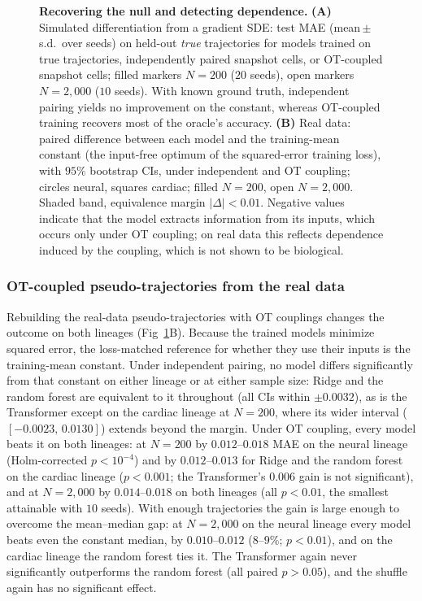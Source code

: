 \documentclass[10pt,letterpaper]{article}
\begin{document}
\begin{figure}[!h]
\caption{\textbf{Recovering the null and detecting dependence.} \textbf{(A)} Simulated differentiation from a gradient SDE: test MAE (mean\,$\pm$\,s.d.\ over seeds) on held-out \emph{true} trajectories for models trained on true trajectories, independently paired snapshot cells, or OT-coupled snapshot cells; filled markers $N=200$ ($20$ seeds), open markers $N=2{,}000$ ($10$ seeds). With known ground truth, independent pairing yields no improvement on the constant, whereas OT-coupled training recovers most of the oracle's accuracy. \textbf{(B)} Real data: paired difference between each model and the training-mean constant (the input-free optimum of the squared-error training loss), with $95\%$ bootstrap CIs, under independent and OT coupling; circles neural, squares cardiac; filled $N=200$, open $N=2{,}000$. Shaded band, equivalence margin $|\Delta|<0.01$. Negative values indicate that the model extracts information from its inputs, which occurs only under OT coupling; on real data this reflects dependence induced by the coupling, which is not shown to be biological.}
\label{fig:positive}
\end{figure}

\subsubsection*{OT-coupled pseudo-trajectories from the real data}
Rebuilding the real-data pseudo-trajectories with OT couplings changes the outcome on both lineages (Fig~\ref{fig:positive}B). Because the trained models minimize squared error, the loss-matched reference for whether they use their inputs is the training-mean constant. Under independent pairing, no model differs significantly from that constant on either lineage or at either sample size: Ridge and the random forest are equivalent to it throughout (all CIs within $\pm0.0032$), as is the Transformer except on the cardiac lineage at $N=200$, where its wider interval ($[-0.0023,\,0.0130]$) extends beyond the margin. Under OT coupling, every model beats it on both lineages: at $N=200$ by $0.012$--$0.018$ MAE on the neural lineage (Holm-corrected $p<10^{-4}$) and by $0.012$--$0.013$ for Ridge and the random forest on the cardiac lineage ($p<0.001$; the Transformer's $0.006$ gain is not significant), and at $N=2{,}000$ by $0.014$--$0.018$ on both lineages (all $p<0.01$, the smallest attainable with $10$ seeds). With enough trajectories the gain is large enough to overcome the mean--median gap: at $N=2{,}000$ on the neural lineage every model beats even the constant median, by $0.010$--$0.012$ ($8$--$9\%$; $p<0.01$), and on the cardiac lineage the random forest ties it. The Transformer again never significantly outperforms the random forest (all paired $p>0.05$), and the shuffle again has no significant effect.
\end{document}

